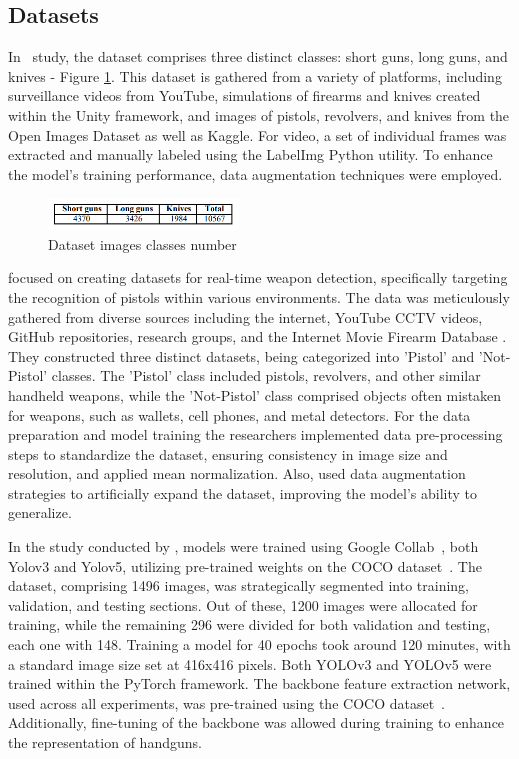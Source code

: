 \subsection{Datasets}
In~\citet{rfc3} study, the dataset comprises three distinct classes: short guns, long guns, and knives - Figure \ref{fig:rehman-dataset}. This dataset is gathered from a variety of platforms, including surveillance videos from YouTube, simulations of firearms and knives created within the Unity framework, and images of pistols, revolvers, and knives from the Open Images Dataset as well as Kaggle. For video, a set of individual frames was extracted and manually labeled using the LabelImg Python utility. To enhance the model's training performance, data augmentation techniques were employed.

\begin{figure}[h]
    \centering 
    \includegraphics[width=0.45\textwidth]{figs/rheman-dataset.png} 
    \caption{Dataset images classes number~\cite{rfc3} }
    \label{fig:rehman-dataset}
\end{figure}

\citet{rfc4} focused on creating datasets for real-time weapon detection, specifically targeting the recognition of pistols within various environments. The data was meticulously gathered from diverse sources including the internet, YouTube CCTV videos, GitHub repositories, research groups, and the Internet Movie Firearm Database \cite{rfc28}.
They constructed three distinct datasets, being categorized into 'Pistol' and 'Not-Pistol' classes. The 'Pistol' class included pistols, revolvers, and other similar handheld weapons, while the 'Not-Pistol' class comprised objects often mistaken for weapons, such as wallets, cell phones, and metal detectors. For the data preparation and model training the researchers implemented data pre-processing steps to standardize the dataset, ensuring consistency in image size and resolution, and applied mean normalization. Also, used data augmentation strategies to artificially expand the dataset, improving the model's ability to generalize.

In the study conducted by \citet{rfc5}, models were trained using Google Collab~\cite{rfc26}, both Yolov3 and Yolov5, utilizing pre-trained weights on the COCO dataset~\cite{rfc16}. The dataset, comprising 1496 images, was strategically segmented into training, validation, and testing sections. Out of these, 1200 images were allocated for training, while the remaining 296 were divided for both validation and testing, each one with 148. Training a model for 40 epochs took around 120 minutes, with a standard image size set at 416x416 pixels. Both YOLOv3 and YOLOv5 were trained within the PyTorch framework. The backbone feature extraction network, used across all experiments, was pre-trained using the COCO dataset~\cite{rfc16}. Additionally, fine-tuning of the backbone was allowed during training to enhance the representation of handguns.

